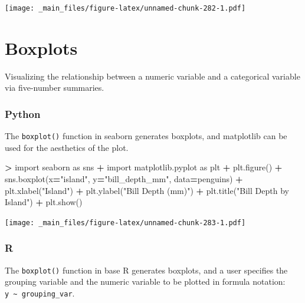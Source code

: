 \documentclass[
]{book}
\newenvironment{Shaded}{\begin{snugshade}}{\end{snugshade}}
\newcommand{\ImportTok}[1]{#1}
\newcommand{\NormalTok}[1]{#1}
\newcommand{\OperatorTok}[1]{\textcolor[rgb]{0.81,0.36,0.00}{\textbf{#1}}}
\newcommand{\StringTok}[1]{\textcolor[rgb]{0.31,0.60,0.02}{#1}}
\begin{document}
\texttt{[image: \_main\_files/figure-latex/unnamed-chunk-282-1.pdf]}

\hypertarget{boxplots}{%
\section{Boxplots}\label{boxplots}}

Visualizing the relationship between a numeric variable and a categorical variable via five-number summaries.

\hypertarget{python-45}{%
\subsubsection*{Python}\label{python-45}}

The \texttt{boxplot()} function in seaborn generates boxplots, and matplotlib can be used for the aesthetics of the plot.

\begin{Shaded}
\begin{Highlighting}[]
\OperatorTok{\textgreater{}} \ImportTok{import}\NormalTok{ seaborn }\ImportTok{as}\NormalTok{ sns}
\OperatorTok{+} \ImportTok{import}\NormalTok{ matplotlib.pyplot }\ImportTok{as}\NormalTok{ plt}
\OperatorTok{+}\NormalTok{ plt.figure()}
\OperatorTok{+}\NormalTok{ sns.boxplot(x}\OperatorTok{=}\StringTok{"island"}\NormalTok{, y}\OperatorTok{=}\StringTok{"bill\_depth\_mm"}\NormalTok{, data}\OperatorTok{=}\NormalTok{penguins)}
\OperatorTok{+}\NormalTok{ plt.xlabel(}\StringTok{"Island"}\NormalTok{)}
\OperatorTok{+}\NormalTok{ plt.ylabel(}\StringTok{"Bill Depth (mm)"}\NormalTok{)}
\OperatorTok{+}\NormalTok{ plt.title(}\StringTok{"Bill Depth by Island"}\NormalTok{)}
\OperatorTok{+}\NormalTok{ plt.show()}
\end{Highlighting}
\end{Shaded}

\texttt{[image: \_main\_files/figure-latex/unnamed-chunk-283-1.pdf]}

\hypertarget{r-45}{%
\subsubsection*{R}\label{r-45}}

The \texttt{boxplot()} function in base R generates boxplots, and a user specifies the grouping variable and the numeric variable to be plotted in formula notation: \texttt{y\ \textasciitilde{}\ grouping\_var}.
\end{document}
